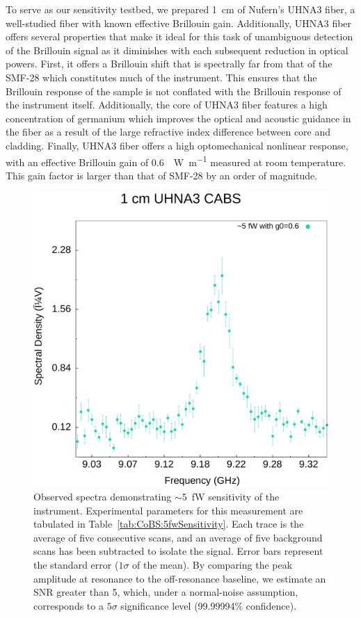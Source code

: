 To serve as our sensitivity testbed, we prepared \SI{1}{\centi\meter} of Nufern's \acl{UHNA3} fiber, a well-studied fiber with known effective Brillouin gain\cite{behunin2015long}. Additionally, \ac{UHNA3} fiber offers several properties that make it ideal for this task of unambiguous detection of the Brillouin signal as it diminishes with each subsequent reduction in optical powers. First, it offers a Brillouin shift that is spectrally far from that of the \ac{SMF-28} which constitutes much of the instrument. This ensures that the Brillouin response of the sample is not conflated with the Brillouin response of the instrument itself. Additionally, the core of \ac{UHNA3} fiber features a high concentration of germanium which improves the optical and acoustic guidance in the fiber as a result of the large refractive index difference between core and cladding. Finally, \ac{UHNA3} fiber offers a high optomechanical nonlinear response, with an effective Brillouin gain of \SI{0.6}{\per\watt\per\meter} measured at room temperature\cite{behunin2015long}. This gain factor is larger than that of \ac{SMF-28} by an order of magnitude\cite{nikles1997brillouin}.

\begin{figure}[t!]
  \centering
  \includegraphics[width=\textwidth]{figs/3-CoBS/5fWSensitivity.pdf}
  \caption{Observed spectra demonstrating \(\sim\)\SI{5}{\femto\watt} sensitivity of the instrument. Experimental parameters for this measurement are tabulated in Table~\ref{tab:CoBS:5fwSensitivity}. Each trace is the average of five consecutive scans, and an average of five background scans has been subtracted to isolate the signal. Error bars represent the standard error (\(1\sigma\) of the mean). By comparing the peak amplitude at resonance to the off-resonance baseline, we estimate an \ac{SNR} greater than 5, which, under a normal-noise assumption, corresponds to a \(5\sigma\) significance level (99.99994\% confidence).}
  \label{fig:CoBS:5fWSensitivity}
\end{figure}

